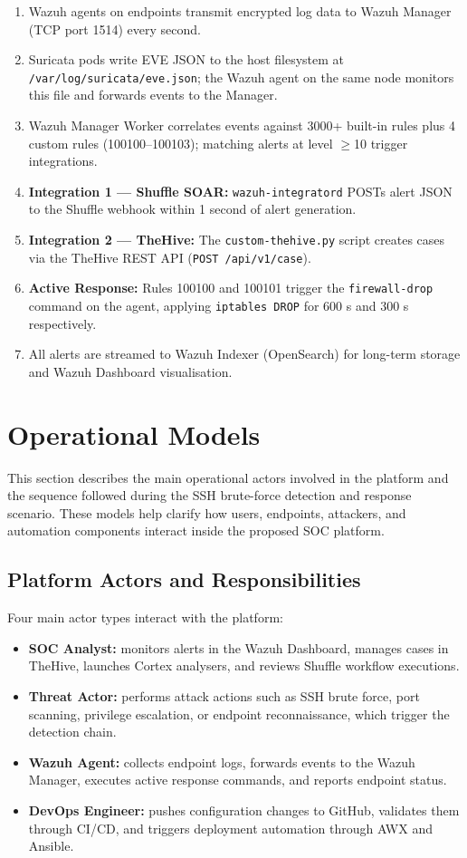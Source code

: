 \documentclass[12pt,a4paper]{report}
\begin{document}
\begin{enumerate}
  \item Wazuh agents on endpoints transmit encrypted log data to Wazuh Manager (TCP port 1514) every second.
  \item Suricata pods write EVE JSON to the host filesystem at \texttt{/var/log/suricata/eve.json}; the Wazuh agent on the same node monitors this file and forwards events to the Manager.
  \item Wazuh Manager Worker correlates events against 3000+ built-in rules plus 4 custom rules (100100--100103); matching alerts at level $\geq$10 trigger integrations.
  \item \textbf{Integration 1 --- Shuffle SOAR:} \texttt{wazuh-integratord} POSTs alert JSON to the Shuffle webhook within 1 second of alert generation.
  \item \textbf{Integration 2 --- TheHive:} The \texttt{custom-thehive.py} script creates cases via the TheHive REST API (\texttt{POST /api/v1/case}).
  \item \textbf{Active Response:} Rules 100100 and 100101 trigger the \texttt{firewall-drop} command on the agent, applying \texttt{iptables DROP} for 600 s and 300 s respectively.
  \item All alerts are streamed to Wazuh Indexer (OpenSearch) for long-term storage and Wazuh Dashboard visualisation.
\end{enumerate}

\section{Operational Models}

This section describes the main operational actors involved in the platform and the sequence followed during the SSH brute-force detection and response scenario. These models help clarify how users, endpoints, attackers, and automation components interact inside the proposed SOC platform.

\subsection{Platform Actors and Responsibilities}

Four main actor types interact with the platform:

\begin{itemize}
  \item \textbf{SOC Analyst:} monitors alerts in the Wazuh Dashboard, manages cases in TheHive, launches Cortex analysers, and reviews Shuffle workflow executions.
  \item \textbf{Threat Actor:} performs attack actions such as SSH brute force, port scanning, privilege escalation, or endpoint reconnaissance, which trigger the detection chain.
  \item \textbf{Wazuh Agent:} collects endpoint logs, forwards events to the Wazuh Manager, executes active response commands, and reports endpoint status.
  \item \textbf{DevOps Engineer:} pushes configuration changes to GitHub, validates them through CI/CD, and triggers deployment automation through AWX and Ansible.
\end{itemize}
\end{document}
